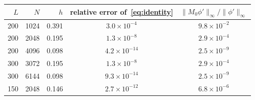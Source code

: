 \begin{tabular}{@{}rrrcc@{}}
\toprule
$L$ & $N$ & $h$ & relative error of~\eqref{eq:identity} & $\|M_0\phi'\|_\infty/\|\phi'\|_\infty$\\
\midrule
200 & 1024 & 0.391 & $3.0\times10^{-4}$ & $9.8\times10^{-2}$\\
200 & 2048 & 0.195 & $1.3\times10^{-8}$ & $2.9\times10^{-4}$\\
200 & 4096 & 0.098 & $4.2\times10^{-14}$ & $2.5\times10^{-9}$\\
300 & 3072 & 0.195 & $1.3\times10^{-8}$ & $2.9\times10^{-4}$\\
300 & 6144 & 0.098 & $9.3\times10^{-14}$ & $2.5\times10^{-9}$\\
150 & 2048 & 0.146 & $2.7\times10^{-12}$ & $6.8\times10^{-6}$\\
\bottomrule
\end{tabular}
